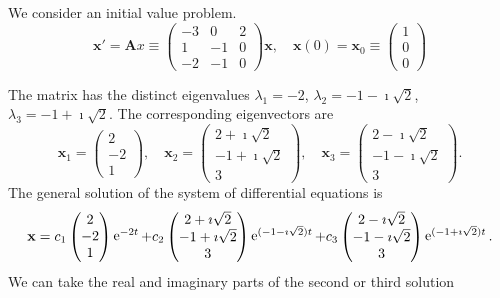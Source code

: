 \begin{Solution}
  \label{solution x'=(-3021-10-2-10)x t-infinity}
  We consider an initial value problem.
  \[
  \mathbf{x}' = \mathbf{A} x \equiv
  \begin{pmatrix}
    -3 & 0 & 2 \\
    1 & -1 & 0 \\
    -2 & -1 & 0
  \end{pmatrix} 
  \mathbf{x}, \quad 
  \mathbf{x}(0) = \mathbf{x}_0 \equiv
  \begin{pmatrix}
    1 \\
    0 \\
    0
  \end{pmatrix}
  \]

  The matrix has the distinct eigenvalues 
  $\lambda_1 = -2$, $\lambda_2 = -1 - \imath \sqrt{2}$, $\lambda_3 = -1 + \imath \sqrt{2}$.  
  The corresponding eigenvectors are 
  \[
  \mathbf{x}_1 = \begin{pmatrix} 2 \\ -2 \\ 1 \end{pmatrix}, \quad
  \mathbf{x}_2 = \begin{pmatrix} 2 + \imath \sqrt{2} \\ 
    -1 + \imath \sqrt{2} \\ 
    3 \end{pmatrix}, \quad
  \mathbf{x}_3 = \begin{pmatrix} 2 - \imath \sqrt{2} \\ 
    -1 - \imath \sqrt{2} \\ 
    3 \end{pmatrix}.
  \]
  The general solution of the system of differential equations is
  \[
  \mathbf{x} = 
  c_1 \begin{pmatrix} 2 \\ -2 \\ 1 \end{pmatrix} \mathop{\mathrm{e}}\nolimits^{-2 t}
  + c_2 \begin{pmatrix} 2 + \imath \sqrt{2} \\ 
    -1 + \imath \sqrt{2} \\ 
    3 \end{pmatrix} \mathop{\mathrm{e}}\nolimits^{(-1 - \imath \sqrt{2}) t}
  + c_3 \begin{pmatrix} 2 - \imath \sqrt{2} \\ 
    -1 - \imath \sqrt{2} \\ 
    3 \end{pmatrix} \mathop{\mathrm{e}}\nolimits^{(-1 + \imath \sqrt{2}) t}.
  \]
  We can take the real and imaginary parts of the second or third solution 

\end{Solution}
